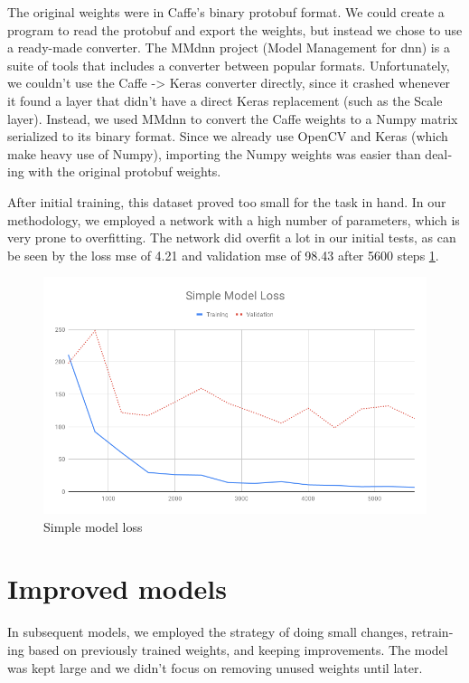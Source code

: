 \documentclass[12pt,openright,oneside,a4paper,english]{abntex2}
\begin{document}
\begin{otherlanguage}{english}
    The original weights were in Caffe's binary protobuf format. We could create a program to read the protobuf and export the weights, but instead we chose to use a ready-made converter. The MMdnn \cite{mmdnn} project (Model Management for \acrshort{dnn}) is a suite of tools that includes a converter between popular formats. Unfortunately, we couldn't use the Caffe -> Keras converter directly, since it crashed whenever it found a layer that didn't have a direct Keras replacement (such as the Scale layer). Instead, we used MMdnn to convert the Caffe weights to a Numpy matrix serialized to its binary format. Since we already use OpenCV and Keras (which make heavy use of Numpy), importing the Numpy weights was easier than dealing with the original protobuf weights.

    After initial training, this dataset proved too small for the task in hand. In our methodology, we employed a network with a high number of parameters, which is very prone to overfitting. The network did overfit a lot in our initial tests, as can be seen by the loss \acrshort{mse} of 4.21 and validation \acrshort{mse} of 98.43 after 5600 steps \ref{simple_loss}.

    \begin{figure}[!htb]
    \centering
    \includegraphics[width=\textwidth]{loss/Simple}
    \caption{Simple model loss}
    \label{simple_loss}
    \end{figure}

    \section{Improved models}

    In subsequent models, we employed the strategy of doing small changes, retraining based on previously trained weights, and keeping improvements. The model was kept large and we didn't focus on removing unused weights until later.


\end{otherlanguage}
\end{document}
